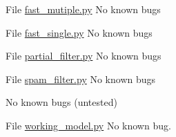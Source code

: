 
\begin{DoxyRefList}
\item[File \mbox{\hyperlink{fast__mutiple_8py}{fast\+\_\+mutiple.py}} ]\label{bug__bug000001}%
%
No known bugs  
\item[File \mbox{\hyperlink{fast__single_8py}{fast\+\_\+single.py}} ]\label{bug__bug000002}%
%
No known bugs  
\item[File \mbox{\hyperlink{partial__filter_8py}{partial\+\_\+filter.py}} ]\label{bug__bug000004}%
%
No known bugs  
\item[File \mbox{\hyperlink{spam__filter_8py}{spam\+\_\+filter.py}} ]\label{bug__bug000003}%
%
No known bugs 

\label{bug__bug000005}%
%
No known bugs (untested)  
\item[File \mbox{\hyperlink{working__model_8py}{working\+\_\+model.py}} ]\label{bug__bug000006}%
%
No known bug. 
\end{DoxyRefList}
